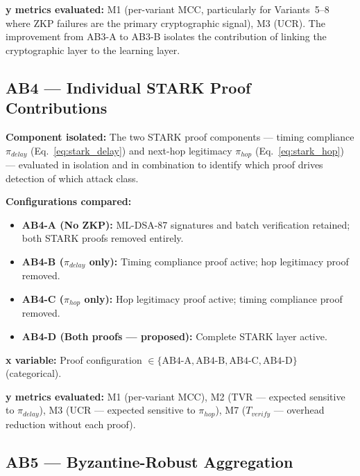 \documentclass[12pt, a4paper]{report}
\begin{document}
{{\textbf{y metrics evaluated:} M1 (per-variant MCC,
particularly for Variants~5--8 where ZKP failures are the
primary cryptographic signal), M3 (UCR). The improvement
from AB3-A to AB3-B isolates the contribution of linking
the cryptographic layer to the learning layer.


\subsection{AB4 — Individual STARK Proof Contributions}
\label{sec:ab4}

\textbf{Component isolated:}
The two \ac{STARK} proof components — timing compliance
$\pi_{delay}$ (Eq.~\ref{eq:stark_delay}) and next-hop
legitimacy $\pi_{hop}$ (Eq.~\ref{eq:stark_hop}) —
evaluated in isolation and in combination to identify
which proof drives detection of which attack class.

\textbf{Configurations compared:}
\begin{itemize}
    \item \textbf{AB4-A (No ZKP):} ML-DSA-87 signatures
    and batch verification retained; both \ac{STARK}
    proofs removed entirely.
    \item \textbf{AB4-B ($\pi_{delay}$ only):}
    Timing compliance proof active; hop legitimacy
    proof removed.
    \item \textbf{AB4-C ($\pi_{hop}$ only):}
    Hop legitimacy proof active; timing compliance
    proof removed.
    \item \textbf{AB4-D (Both proofs — proposed):}
    Complete \ac{STARK} layer active.
\end{itemize}

\textbf{x variable:} Proof configuration
$\in \{\text{AB4-A}, \text{AB4-B},
\text{AB4-C}, \text{AB4-D}\}$ (categorical).

\textbf{y metrics evaluated:} M1 (per-variant MCC),
M2 (TVR — expected sensitive to $\pi_{delay}$),
M3 (UCR — expected sensitive to $\pi_{hop}$),
M7 ($T_{verify}$ — overhead reduction without each proof).


\subsection{AB5 — Byzantine-Robust Aggregation}
\label{sec:ab5}

}}
\end{document}
